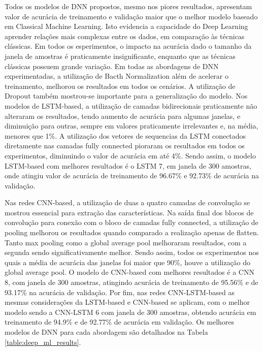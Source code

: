 Todos os modelos de DNN propostos, mesmo nos piores resultados, apresentam valor de acurácia de treinamento e validação maior que o melhor modelo baseado em Classical Machine Learning. Isto evidencia a capacidade do Deep Learning aprender relações mais complexas entre os dados, em comparação às técnicas clássicas. Em todos os esperimentos, o impacto na acurácia dado o tamanho da janela de amostras é praticamente insignificante, enquanto que as técnicas clássicas possuem grande variação. Em todas as abordagens de DNN experimentadas, a utilização de Bacth Normalization além de acelerar o treinamento, melhorou os resultados em todos os cenários. A utilização de Dropout também mostrou-se importante para a generalização do modelo. Nos modelos de LSTM-based, a utilização de camadas bidirecionais praticamente não alteraram os resultados, tendo aumento de acurácia para algumas janelas, e diminuição para outras, sempre em valores praticamente irrelevantes e, na média, menores que 1\%. A utilização dos vetores de sequencias da LSTM conectados diretamente nas camadas fully connected pioraram os resultados em todos os experimentos, diminuindo o valor de acurácia em até 4\%. Sendo assim, o modelo LSTM-based com melhores resultados é o LSTM 7, em janela de 300 amostras, onde atingiu valor de acurácia de treinamento de 96.67\% e 92.73\% de acurácia na validação.

Nas redes CNN-based, a utilização de duas a quatro camadas de convolução se mostrou essencial para extração das características. Na saída final dos blocos de convolução para conexão com o bloco de camadas fully connected, a utilização de pooling melhorou os resultados quando comparado a realização apenas de flatten. Tanto max pooling como a global average pool melhoraram resultados, com a segunda sendo significativamente melhor. Sendo assim, todos os experimentos nos quais a média de acurácia das janelas foi maior que 90\%, houve a utilização do global average pool. O modelo de CNN-based com melhores resultados é a CNN 8, com janela de 300 amostras, atingindo acurácia de treinamento de 95.56\% e de 93.17\% na acurácia de validação. Por fim, nas redes CNN-LSTM-based as mesmas considerações da LSTM-based e CNN-based se aplicam, com o melhor modelo sendo a CNN-LSTM 6 com janela de 300 amostras, obtendo acurácia em treinamento de 94.9\% e de 92.77\% de acurácia em validação. Os melhores modelos de DNN para cada abordagem são detalhados na Tabela \ref{table:deep_ml_results}.

